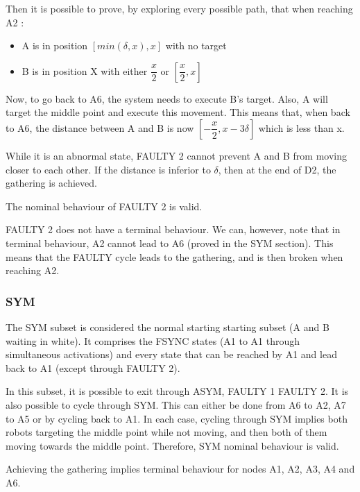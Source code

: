 \documentclass[11pt]{article}
\begin{document}
Then it is possible to prove, by exploring every possible path, that when reaching A2  :

\begin{itemize}
\item A is in position $[min(\delta,x),x]$ with no target
\item B is in position X with either $\dfrac{x}{2}$ or $[\dfrac{x}{2},x]$
\end{itemize}

Now, to go back to A6, the system needs to execute B's target. Also, A will target the middle point and execute this movement.
This means that, when back to A6, the distance between A and B is now $[-\dfrac{x}{2},x-3\delta]$ which is less than x.

While it is an abnormal state, FAULTY 2 cannot prevent A and B from moving closer to each other. If the distance is inferior to $\delta$, then at the end of D2, the gathering is achieved.

The nominal behaviour of FAULTY 2 is valid.

FAULTY 2 does not have a terminal behaviour. We can, however, note that in terminal behaviour, A2 cannot lead to A6 (proved in the SYM section). This means that the FAULTY cycle leads to the gathering, and is then broken when reaching A2.



\subsubsection{SYM}
The SYM subset is considered the normal starting starting subset (A and B waiting in white). It comprises the FSYNC states (A1 to A1 through simultaneous activations) and every state that can be reached by A1 and lead back to A1 (except through FAULTY 2).  

In this subset, it is possible to exit through ASYM, FAULTY 1 FAULTY 2. It is also possible to cycle through SYM. This can either be done from A6 to A2, A7 to A5 or by cycling back to A1. In each case, cycling through SYM implies both robots targeting the middle point while not moving, and then both of them moving towards the middle point. Therefore, SYM nominal behaviour is valid.

Achieving the gathering implies terminal behaviour for nodes A1, A2, A3, A4 and A6.
\end{document}
